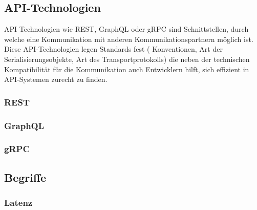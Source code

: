\subsection{API-Technologien}
API Technologien wie REST, GraphQL oder gRPC sind Schnittstellen, durch welche eine Kommunikation mit anderen Kommunikationspartnern möglich ist. Diese API-Technologien legen Standards fest ( Konventionen, Art der Serialisierungsobjekte, Art des Transportprotokolls) die neben der technischen Kompatibilität für die Kommunikation auch Entwicklern hilft, sich effizient in API-Systemen zurecht zu finden.
\subsubsection{REST}
\subsubsection{GraphQL}
\subsubsection{gRPC}
\subsection{Begriffe}
\subsubsection{Latenz}

\chapterend

